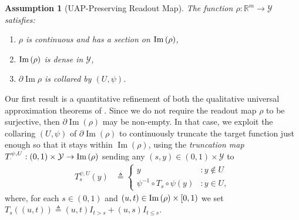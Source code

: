 \documentclass[anon,12pt]{colt2021} %
\newcommand{\rr}{{\mathbb{R}}}
\newcommand{\rrflex}[1]{{\ensuremath{\rr^{#1}
}}}
\newcommand{\rrm}{{\rrflex{m}}}
\newcommand{\yyy}{\mathcal{Y}}
\newtheorem{assumption}{Assumption}
\begin{document}
\begin{assumption}[UAP-Preserving Readout Map]\label{assumptionRho} 
The function $\rho:\rrm\rightarrow \yyy$ satisfies:
\begin{enumerate}[label=(i),leftmargin=1.75em]
    \item $\rho$ is continuous and has a section on $\operatorname{Im}\left({\rho}\right)$,
    \item $\operatorname{Im}\left({\rho}\right)$ is dense in $\mathcal{Y}$,
    \item $\partial \operatorname{Im}\rho$ is collared by $(U,\psi)$.  
\end{enumerate}
\end{assumption}
Our first result is a quantitative refinement of both the qualitative universal approximation theorems of \cite{kratsios2020non,kidger2019universal}. Since we do not require the readout map $\rho$ to be surjective, then $\partial \operatorname{Im}(\rho)$ may be non-empty.  In that case, we exploit the collaring $(U,\psi)$ of $\partial \operatorname{Im}(\rho)$ to continuously truncate the target function just enough so that it stays within $\operatorname{Im}(\rho)$, using the \textit{truncation map} 
$T^{\psi,U}_{\cdot}: (0,1)\times \yyy \rightarrow \im{\rho}$ sending any $(s,y)\in (0,1)\times \yyy$ to 
$$
\begin{aligned}
%
T_s^{\psi,U}(y) &\triangleq 
%
\begin{cases}
y & : y \not\in U\\
\psi^{-1}\circ T_s\circ \psi(y) & : y \in U
,
\end{cases}
\end{aligned}
$$
where, for each $s \in (0,1)$ and $(u,t)\in \operatorname{Im}\left({\rho}\right)\times [0,1)$ we set $T_s((u,t))\triangleq (u,t)I_{t>s} + (u,s)I_{t\leq s}$. 
\end{document}
